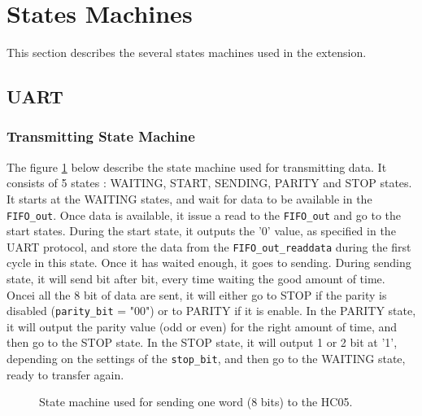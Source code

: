 \documentclass[11pt]{article}
\begin{document}
\section{States Machines}
This section describes the several states machines used in the extension.
\subsection{UART}
\subsubsection{Transmitting State Machine}
The figure \ref{UART_transmit_SM} below describe the state machine used for transmitting data. It consists of 5 states : WAITING, START, SENDING, PARITY and STOP states. It starts at the WAITING states, and wait for data to be available in the \texttt{FIFO\_out}. Once data is available, it issue a read to the \texttt{FIFO\_out} and go to the start states. During the start state, it outputs the '0' value, as specified in the UART protocol, and store the data from the \texttt{FIFO\_out\_readdata} during the first cycle in this state. Once it has waited enough, it goes to sending. During sending state, it will send bit after bit, every time waiting the good amount of time. Oncei all the 8 bit of data are sent, it will either go to STOP if the parity is disabled (\texttt{parity\_bit} = "00") or to PARITY if it is enable. In the PARITY state, it will output the parity value (odd or even) for the right amount of time, and then go to the STOP state. In the STOP state, it will output 1 or 2 bit at '1', depending on the settings of the \texttt{stop\_bit}, and then go to the WAITING state, ready to transfer again.
\begin{figure}[H]
        \center
        \caption{State machine used for sending one word (8 bits) to the HC05.}
        \label{UART_transmit_SM}
\end{figure}
\end{document}
